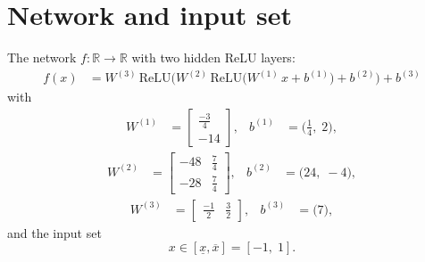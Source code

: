 \documentclass[11pt]{article}
\begin{document}
\section{Network and input set}
The network $f:\mathbb{R} \to \mathbb{R}$ with two hidden ReLU layers:
\begin{align*}
f(x) &= W^{(3)}\,\mathrm{ReLU}\bigl(W^{(2)}\,\mathrm{ReLU}\bigl(W^{(1)}\,x + b^{(1)}\bigr) + b^{(2)}\bigr) + b^{(3)}
\end{align*}
with
\begin{align*}
W^{(1)} &= \begin{bmatrix}
\frac{-3}{4} \\
-14
\end{bmatrix}, & b^{(1)} &= \bigl(\frac{1}{4},\; 2\bigr),
\end{align*}
\begin{align*}
W^{(2)} &= \begin{bmatrix}
-48 & \frac{7}{4} \\
-28 & \frac{7}{4}
\end{bmatrix}, & b^{(2)} &= \bigl(24,\; -4\bigr),
\end{align*}
\begin{align*}
W^{(3)} &= \begin{bmatrix}
\frac{-1}{2} & \frac{3}{2}
\end{bmatrix}, & b^{(3)} &= \bigl(7\bigr),
\end{align*}
and the input set
\begin{equation*}
 x \in [\underline{x}, \overline{x}] = [-1,\; 1].
\end{equation*}
\end{document}
